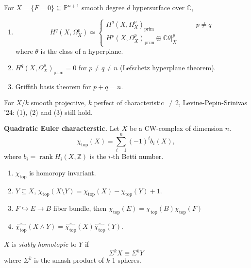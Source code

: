 \noindent
For $X = \{F=0\} \subseteq \mathbb{P}^{n+1}$
smooth degree $d$ hypersurface over
$\mathbb{C}$,
\begin{enumerate}
\item 
$$
H^q(X,\Omega_X^p)
\simeq \begin{cases}
H^q(X,\Omega_X^p)_{\operatorname{prim}}\qquad
&p \neq q \\
H^p(X,\Omega_X^p)_{\operatorname{prim}}\oplus
\mathbb{C}\theta |_X^p\qquad &
\end{cases}
$$
where $\theta$ is the class of a hyperplane.

\item
$H^q(X,\Omega_X^p)_{\operatorname{prim}}=0$
for $p \neq q \neq  n$ 
(Lefschetz hyperplane theorem).

\item Griffith basis theorem for $p+q=n$.
\end{enumerate}

\begin{remark}
\label{remark-lps}
For $X/k$ smooth projective, $k$ perfect
of characteristic $\neq 2$,
Levine-Pepin-Srinivas '24: (1), (2)
and (3) still hold.
\end{remark}

\medskip\noindent
{\bf Quadratic Euler characterstic.} 
Let $X$ be a CW-complex of dimension $n$.
$$
\chi_{\operatorname{top}}(X)
=\sum_{i=1}^n(-1)^i b_i(X),
$$
where
$b_i=\operatorname{rank}H_i(X,\mathbb{Z})$
is the $i$-th Betti number.

\begin{proposition}
\label{proposition-properties-of-euler}
\begin{enumerate}
\item $\chi_{\operatorname{top}}$
is homoropy invariant.
\item $Y \subseteq X$,
$\chi_{\operatorname{top}}(X\setminus Y)
=\chi_{\operatorname{top}}(X)
-\chi_{\operatorname{top}}(Y)+1$.
\item $F \hookrightarrow E \to B$ fiber
bundle, then $\chi_{\operatorname{top}}(E) =
\chi_{\operatorname{top}}(B)
\chi_{\operatorname{top}}(F)$

\item $\hat{\chi_{\operatorname{top}}}(X
\wedge Y) =
\hat{\chi_{\operatorname{top}}}(X)
\hat{\chi_{\operatorname{top}}}(Y)$.
\end{enumerate}
\end{proposition}

\begin{definition}
\label{definition-stably-homotopic}
$X$ is {\it stably homotopic} to $Y$
if
$$
\Sigma^kX \equiv \Sigma^kY
$$
where $\Sigma^k$ is the smash product
of $k$ 1-spheres.
\end{definition}

